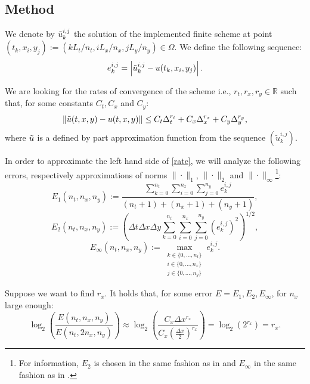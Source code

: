 \documentclass{article}
\begin{document}
\subsection{Method}
\label{methodSS}

We denote by $\Tilde{u}_k^{i, j}$ the solution of the implemented finite scheme at point $(t_k, x_i, y_j) := (kL_t/n_t, iL_x/n_x, jL_y/n_y) \in \Omega$. We define the following sequence: 
\begin{equation}
	e_k^{i, j} = \left| \Tilde{u}_k^{i, j} - u(t_k, x_i, y_j) \right|.
\end{equation}

We are looking for the rates of convergence of the scheme i.e., $r_t, r_x, r_y \in \mathbb{R}$ such that, for some constants $C_t, C_x$ and $C_y$:
\begin{equation}
\label{rate}
	\| \Tilde{u}(t, x, y) - u(t, x, y) \| \leq C_t \Delta_t^{r_t} + C_x \Delta_x^{r_x} + C_y \Delta_y^{r_y}, 
\end{equation}
where $\Tilde{u}$ is a defined by part approximation function from the sequence $\left( \tilde{u}_k^{i, j} \right)$.

In order to approximate the left hand side of \eqref{rate}, we will analyze the following errors, respectively approximations of norms $\| \cdot \|_1$, $\| \cdot \|_2$ and $\| \cdot \|_\infty$\footnote{For information, $E_2$ is chosen in the same fashion as in \cite{book} and $E_\infty$ in the same fashion as in \cite{morton_mayers_2005}.}:
\begin{equation}
	E_1(n_t, n_x, n_y) := \frac{\sum_{k = 0}^{n_t} \sum_{i = 0}^{n_x} \sum_{j = 0}^{n_y} e_k^{i, j}}{(n_t + 1) + (n_x + 1) + (n_y + 1)},  
\end{equation}
\begin{equation}
	E_2(n_t, n_x, n_y) := \left( \Delta t \Delta x \Delta y \sum_{k = 0}^{n_t} \sum_{i = 0}^{n_x} \sum_{j = 0}^{n_y} \left(e_k^{i, j}\right)^2 \right )^{1/2}, 
\end{equation}
\begin{equation}
	E_\infty(n_t, n_x, n_y)  := \max_{\substack{k \in \{ 0, \dots, n_t\} \\ i \in \{ 0, \dots, n_x\} \\ j \in \{ 0, \dots, n_y \} }} e_k^{i, j}.
\end{equation}

Suppose we want to find $r_x$. It holds that, for some error $E = E_1, E_2, E_\infty$, for $n_x$ large enough:
\begin{equation}
\label{method}
	\log_2\left( \frac{E(n_t, n_x, n_y)}{E(n_t, 2n_x, n_y)} \right) \approx \log_2\left(  \frac{C_x \Delta x^{r_x}}{C_x \left( \frac{\Delta x}{2} \right)^{r_x}} \right) = \log_2 \left( 2^{r_x} \right) = r_x.
\end{equation}
\end{document}
